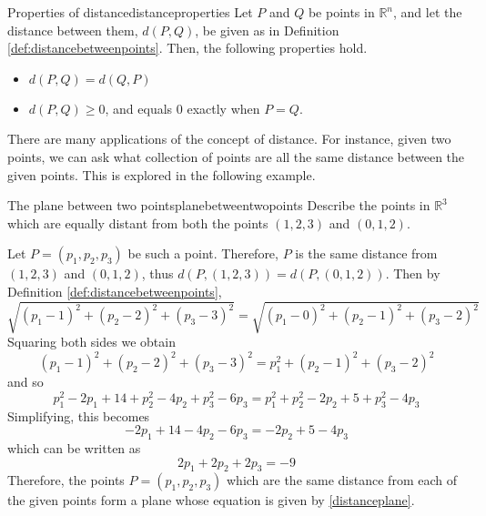 \begin{theorem}{Properties of distance}{distanceproperties}
Let $P$ and $Q$ be points in $\mathbb{R}^n$, and let the distance between them,
$d( P, Q)$, be given as in Definition \ref{def:distancebetweenpoints}. 
Then, the following properties hold.
\begin{itemize}
\item $ d( P, Q) = d( Q, P)  $
\item $ d( P, Q) \geq 0$, and equals 0 exactly when $P = Q.$
\end{itemize}
\end{theorem}

There are many applications of the concept of distance. For instance,
given two points, we can ask what collection of points are all the
same distance between the given points. This is explored in the
following example.

\begin{example}{The plane between two points}{planebetweentwopoints}
Describe the points in $\mathbb{R}^3$ which are equally distant from both the points $\left(
1,2,3\right) $ and $\left( 0,1,2\right) .$
\end{example}

\begin{solution}
Let $P = \left( p_1 , p_2, p_3\right) $ be such a point. Therefore, $P$ is the same distance from $\left(
1,2,3\right) $ and $\left( 0,1,2\right) $, thus $d(P,(1,2,3))=d(P,(0,1,2))$.
Then by Definition \ref{def:distancebetweenpoints},
\begin{equation*}
\sqrt{\left( p_1 -1\right) ^{2}+\left( p_2 -2\right) ^{2}+\left( p_3-3\right) ^{2}}=
\sqrt{\left( p_1 - 0 \right)^{2}+\left( p_2-1\right) ^{2}+\left( p_3-2\right) ^{2}}
\end{equation*}
Squaring both sides we obtain 
\begin{equation*}
\left( p_1 -1\right) ^{2}+\left( p_2 -2\right) ^{2}+\left( p_3 -3\right)
^{2}=p_1^{2}+\left( p_2-1\right) ^{2}+\left( p_3 -2\right) ^{2}
\end{equation*}
and so
\begin{equation*}
\allowbreak p_1^{2}-2p_1+14+p_2^{2}-4p_2+p_3^{2}-6p_3=p_1^{2}+p_2^{2}-2p_2+5+p_3^{2}-4p_3
\end{equation*}
Simplifying, this becomes
\begin{equation*}
-2p_1+14-4p_2-6p_3=-2p_2+5-4p_3
\end{equation*}
which can be written as 
\begin{equation}
2p_1+2p_2+2p_3=-9  \label{distanceplane}
\end{equation}
Therefore, the points $P = \left(
p_1,p_2,p_3\right) $  which are the same 
distance from each of the given points form a plane whose equation is given by \ref{distanceplane}.
\end{solution}

